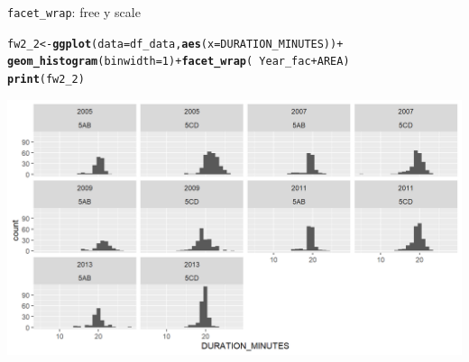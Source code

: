 \documentclass{beamer}\usepackage[]{graphicx}\usepackage[]{color}
\makeatletter
\newcommand{\hlnum}[1]{\textcolor[rgb]{0.686,0.059,0.569}{#1}}%
\newcommand{\hlopt}[1]{\textcolor[rgb]{0,0,0}{#1}}%
\newcommand{\hlstd}[1]{\textcolor[rgb]{0.345,0.345,0.345}{#1}}%
\newcommand{\hlkwb}[1]{\textcolor[rgb]{0.69,0.353,0.396}{#1}}%
\newcommand{\hlkwc}[1]{\textcolor[rgb]{0.333,0.667,0.333}{#1}}%
\newcommand{\hlkwd}[1]{\textcolor[rgb]{0.737,0.353,0.396}{\textbf{#1}}}%
\newenvironment{kframe}{%
 \def\at@end@of@kframe{}%
 \ifinner\ifhmode%
  \def\at@end@of@kframe{\end{minipage}}%
  \begin{minipage}{\columnwidth}%
 \fi\fi%
 \def\FrameCommand##1{\hskip\@totalleftmargin \hskip-\fboxsep
 \colorbox{shadecolor}{##1}\hskip-\fboxsep
     \hskip-\linewidth \hskip-\@totalleftmargin \hskip\columnwidth}%
 \MakeFramed {\advance\hsize-\width
   \@totalleftmargin\z@ \linewidth\hsize
   \@setminipage}}%
 {\par\unskip\endMakeFramed%
 \at@end@of@kframe}
\newenvironment{knitrout}{}{} %
\makeatother
\begin{document}
\begin{frame}[fragile]{\lstinline{facet_wrap}: free y scale}
\begin{knitrout}\footnotesize
{}\color{fgcolor}\begin{kframe}
\begin{alltt}
\hlstd{fw2_2} \hlkwb{<-} \hlkwd{ggplot}\hlstd{(}\hlkwc{data}\hlstd{=df_data,} \hlkwd{aes}\hlstd{(}\hlkwc{x}\hlstd{=DURATION_MINUTES))} \hlopt{+}
  \hlkwd{geom_histogram}\hlstd{(}\hlkwc{binwidth}\hlstd{=}\hlnum{1}\hlstd{)} \hlopt{+} \hlkwd{facet_wrap}\hlstd{(} \hlopt{~} \hlstd{Year_fac} \hlopt{+} \hlstd{AREA)}
\hlkwd{print}\hlstd{(fw2_2)}
\end{alltt}
\end{kframe}

{\centering \includegraphics[width=.9\linewidth]{figure/facet_wrap_6-1} 

}



\end{knitrout}
\end{frame}
\end{document}
